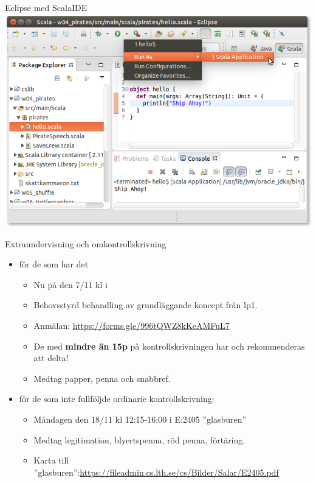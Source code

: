 \begin{Slide}{Eclipse med ScalaIDE}
\includegraphics[width=\textwidth]{../img/eclipse/eclipse-pirates-hello.png}
\end{Slide}

\ifkompendium\else
\begin{Slide}{Extraundervisning och omkontrollskrivning}
  \begin{itemize}
    \item {} för de som har det 
    \begin{itemize}
      \item Nu på  den 7/11 kl  i 
      \item Behovsstyrd behandling av grundläggande koncept från lp1.
      \item Anmälan: {\small \url{https://forms.gle/996tQWZ8kKeAMFuL7}}
      \item De med \textbf{mindre än 15p} på kontrollskrivningen har  och rekommenderas  att delta!
      \item Medtag papper, penna och snabbref.
    \end{itemize}
    \item {} för de som inte fullföljde ordinarie kontrollskrivning:
    \begin{itemize}
      \item Måndagen den 18/11 kl 12:15-16:00 i E:2405 ''glasburen''
      \item Medtag legitimation, blyertspenna, röd penna, förtäring.
      \item Karta till ''glasburen'':{\url{https://fileadmin.cs.lth.se/cs/Bilder/Salar/E2405.pdf} }
    \end{itemize}
  \end{itemize}
\end{Slide}
\fi 